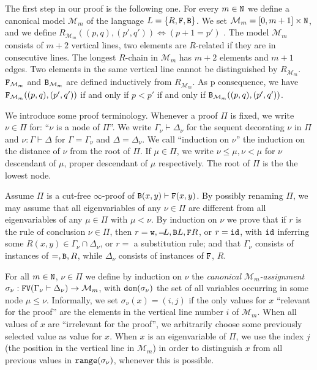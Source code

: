 \documentclass[a4paper,12pt]{article}
\newcommand{\setM}              { {\mathcal M} }
\newcommand{\Nat}               { {\tt N}  }
\newcommand{\Backward}         { {\tt B} }
\newcommand{\Forward}         { {\tt F} }
\newcommand{\FV}              { {\tt FV} }
\newcommand{\id}              { {\tt id} }
\newcommand{\dom}             { {\tt dom} }
\newcommand{\range}           { {\tt range} }
\newcommand{\eqL}     {= \! \!  \!  L}
\newcommand{\Weak} { {\tt w} }
\begin{document}
The first step in our proof is the following one. For every $m \in \Nat$ we define a canonical model $\setM_m$ of the language $L = \{R, \Forward, \Backward\}$.
We set $\setM_m = [0,m+1] \times \Nat$, and we define $R_{\setM_m}((p,q),(p',q')) \Leftrightarrow (p+1=p')$ .
The model $\setM_m$ consists of $m+2$ vertical lines, two elements are $R$-related if they are in consecutive lines. The longest $R$-chain in $\setM_m$ has $m+2$ elements and $m+1$ edges. Two elements in the same vertical line cannot be distinguished by $R_{\setM_m}$. $\Forward_{\setM_m}$ and $\Backward_{\setM_m}$ are defined inductively from $R_{\setM_m}$. As p consequence, we have $\Forward_{\setM_m}((p,q),(p',q'))$ if and only if $p<p'$ if and only if $\Backward_{\setM_m}((p,q),(p',q'))$.

We introduce some proof terminology.
Whenever a proof $\Pi$ is fixed, we write $\nu \in \Pi$ for: ``$\nu$ is a node of $\Pi$''. We write $\Gamma_\nu \vdash \Delta_\nu$ for the sequent decorating $\nu$ in $\Pi$ and $\nu:\Gamma \vdash \Delta$ for $\Gamma = \Gamma_\nu$ and $\Delta = \Delta_\nu$. 
We call ``induction on $\nu$'' the induction on the distance of $\nu$ from the root of $\Pi$. If $\mu \in \Pi$, we write $\nu \le \mu, \nu < \mu$ for $\nu$ descendant of $\mu$, proper descendant of $\mu$ respectively. The root of $\Pi$ is the the lowest node.

Assume $\Pi$ is a cut-free $\infty$-proof of $\Backward(x,y) \vdash \Forward(x,y)$. By possibly renaming $\Pi$, we may assume that all eigenvariables of any $\nu \in \Pi$ are different from all eigenvariables of any $\mu \in \Pi$ with $\mu < \nu$. By induction on $\nu$ we prove that if $r$ is the rule of conclusion $\nu \in \Pi$, then $r=\Weak, \eqL, \Backward L, \Forward R$, or $r=\id$, with $\id$ inferring some $R(x,y) \in \Gamma_\nu \cap \Delta_\nu$, or $r=$ a substitution rule; and that $\Gamma_\nu$ consists of instances of $=,\Backward,R$, while $\Delta_\nu$ consists of instances of $\Forward$, $R$.

For all $m \in \Nat$, $\nu \in \Pi$ we define by induction on $\nu$ the \emph{canonical $\setM_m$-assignment} $\sigma_\nu : \FV(\Gamma_\nu \vdash \Delta_\nu) \rightarrow \setM_m$, with $\dom(\sigma_\nu)$  the set of all variables occurring in some node  $\mu \le \nu$. Informally, we set $\sigma_\nu(x) = (i,j)$ if the only values for $x$ ``relevant for the proof'' are the elements in the vertical line number $i$ of $\setM_m$. When all values of $x$ are ``irrelevant for the proof'', we arbitrarily choose some previously selected value as value for $x$. When $x$ is an eigenvariable of $\Pi$, we use the index $j$ (the position in the vertical line in $\setM_m$) in order to distinguish $x$ from all previous values in $\range(\sigma_\nu)$, whenever this is possible. 
\end{document}
